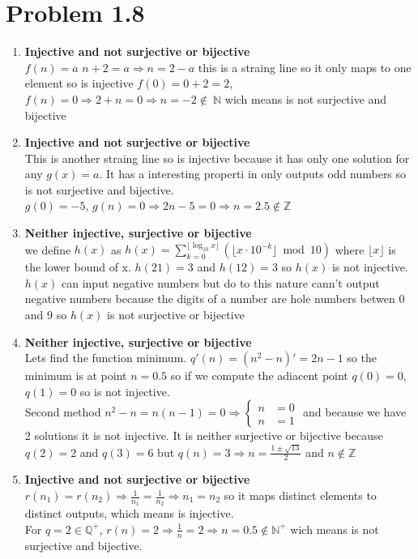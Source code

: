 \documentclass[12pt]{article}
\begin{document}
 \section*{Problem 1.8}
 \begin{enumerate}[label=\arabic*.]
    \item \textbf{Injective and not surjective or bijective}\\ $f(n) = a$ 
    $n+2=a \Rightarrow n = 2-a$ this is a straing line so it only maps to one element so is injective
    $f(0)=0+2=2$,  $f(n)=0 \Rightarrow 2+n = 0 \Rightarrow n = -2 \not \in \ \mathbb{N}$ wich means is not surjective and bijective
    \item \textbf{Injective and not surjective or bijective}\\ This is another straing line so is injective because it has only one solution for any $g(x) = a$. It has a interesting properti in only outputs odd numbers so is not surjective and bijective.\\
    $g(0) = -5$, $g(n) = 0 \Rightarrow 2n-5 = 0 \Rightarrow n = 2.5 \not\in \mathbb{Z}$
    \item \textbf{Neither  injective, surjective or bijective}\\ we define $h(x)$ as 
    $h(x) = \sum_{k=0}^{\lfloor \log_{10} x \rfloor} \left( \lfloor x \cdot 10^{-k} \rfloor \bmod 10 \right)$ where $\lfloor x \rfloor$ is the lower bound of x. $h(21) = 3$ and $h(12) = 3$ so $h(x)$ is not injective. $h(x)$ can input negative numbers but do to this nature cann't output negative numbers because the digits of a number are hole numbers betwen 0 and 9 so $h(x)$ is not surjective or bijective
    \item \textbf{Neither  injective, surjective or bijective}\\Lets find the function minimum. $q'(n)=(n^2-n)'=2n-1$ so the minimum is at point $n=0.5$ so if we compute the adiacent point $q(0)=0$, $q(1)=0$ so is not injective. \\
    Second method $n^2-n=n(n-1)=0 \Rightarrow \begin{cases}  
  n &= 0 \\
  n&= 1
\end{cases}$ and because we have 2 solutions it is not injective.
It is neither surjective or bijective because $q(2)=2$ and $q(3)=6$ but $q(n) = 3 \Rightarrow n=\frac{1\pm\sqrt{13}}{2}$ and $n\not\in \mathbb{Z}$
\item \textbf{Injective and not surjective or bijective}\\
    $r(n_1) = r(n_2) \Rightarrow \frac{1}{n_1} = \frac{1}{n_2} \Rightarrow n_1 = n_2$ so it maps distinct elements to distinct outputs, which means is injective.\\
    For $q = 2 \in \mathbb{Q}^+$, $r(n) = 2 \Rightarrow \frac{1}{n} = 2 \Rightarrow n = 0.5 \not\in \mathbb{N}^+$ wich means is not surjective and bijective.

\end{enumerate}
\end{document}
